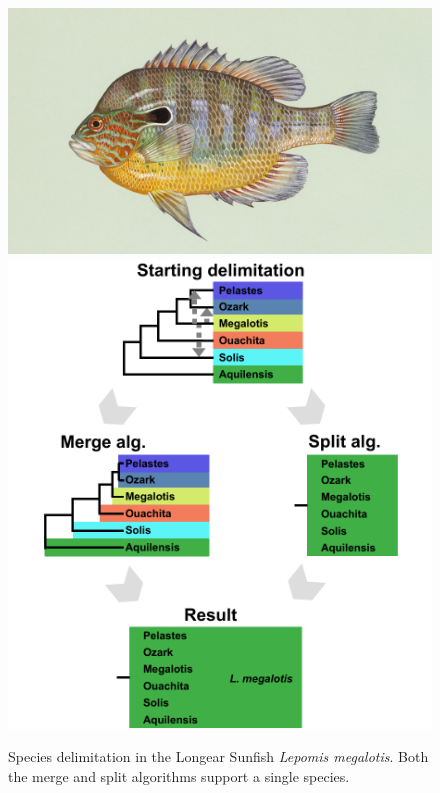 \documentclass[A4]{article1}
\begin{document}
\begin{figure}[t]
    \centering %
    \includegraphics[scale=0.3]{figs/Sunfish/Lepomis_megalotis}
    \includegraphics[scale=0.5]{figs/fig-longear-fish-results}
    
    \caption{Species delimitation in the Longear Sunfish \textit{Lepomis megalotis}.
        Both the merge and split algorithms support a single species. %
    } \label{fig:sunfish}
\end{figure}
\end{document}
